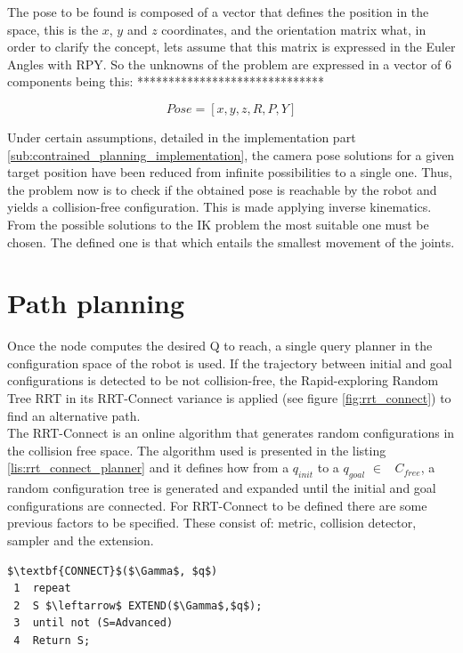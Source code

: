 The pose to be found is composed of a vector that defines the position in the space, this is the $x$, $y$ and $z$ coordinates, and the orientation matrix what, in order to clarify the concept, lets assume that this matrix is expressed in the Euler Angles with RPY. So the unknowns of the problem are expressed in a vector of 6 components being this:
******************************

	\begin{equation}
	\label{eq:pose_cartesian_coordinates}
		Pose = [x,y,z,R,P,Y]
	\end{equation}

Under certain assumptions, detailed in the implementation part \ref{sub:contrained_planning_implementation}, the camera pose solutions for a given target position have been reduced from infinite possibilities to a single one. 
Thus, the problem now is to check if the obtained pose is reachable by the robot and yields a collision-free configuration. 
This is made applying inverse kinematics. 
From the possible solutions to the IK problem the most suitable one must be chosen.
The defined one is that which entails the smallest movement of the joints.

\section{Path planning} %
\label{sec:path_planning}
Once the node computes the desired Q to reach, a single query planner in the configuration space of the robot is used. If the trajectory between initial and goal configurations is detected to be not collision-free, the Rapid-exploring Random Tree RRT in its RRT-Connect variance \cite{RRTConnect} is applied (see figure \ref{fig:rrt_connect}) to find an alternative path.\\

The RRT-Connect is an online algorithm that generates random configurations in the collision free space.
The algorithm used is presented in the listing \ref{lis:rrt_connect_planner} and it defines how from a $q_{init}$ to a $q_{goal}$ $\in$ \ $C_{free}$, a random configuration tree is generated and expanded until the initial and goal configurations are connected. For RRT-Connect to be defined there are some previous factors to be specified. These consist of: metric, collision detector, sampler and the extension.

\begin{lstlisting}[frame=tb, mathescape=true, xleftmargin=.28\textwidth, xrightmargin=.28\textwidth,caption=RRT-Connect Algorithm, label=lis:rrt_connect_planner]
$\textbf{CONNECT}$($\Gamma$, $q$)
 1  repeat 
 2  S $\leftarrow$ EXTEND($\Gamma$,$q$);
 3  until not (S=Advanced)
 4  Return S;
\end{lstlisting}
\lstset{}

